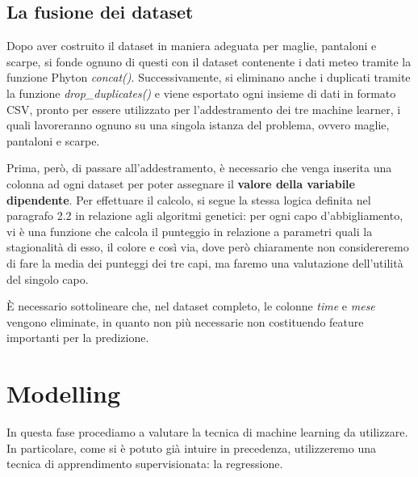 \documentclass[a4paper, 11pt, oneside]{report}
\begin{document}
                \bigskip

                \subsection{La fusione dei dataset}
                Dopo aver costruito il dataset in maniera adeguata per maglie, pantaloni e scarpe, si fonde ognuno di
                questi con il dataset contenente i dati meteo tramite la funzione Phyton \textit{concat()}. Successivamente,
                si eliminano anche i duplicati tramite la funzione \textit{drop\_duplicates()} e viene esportato ogni insieme
                di dati in formato CSV, pronto per essere utilizzato per l'addestramento dei tre machine learner,
                i quali lavoreranno ognuno su una singola istanza del problema, ovvero maglie, pantaloni
                e scarpe.\\
                \par \noindent Prima, però, di passare all'addestramento,
                è necessario che venga inserita una colonna ad ogni dataset per poter assegnare il \textbf{valore della variabile dipendente}.
                Per effettuare il calcolo, si segue la stessa logica definita nel paragrafo 2.2 in relazione agli algoritmi genetici:
                per ogni capo d'abbigliamento, vi è una funzione che calcola il punteggio in relazione a parametri quali la stagionalità
                di esso, il colore e così via, dove però chiaramente non considereremo di fare la media dei punteggi dei
                tre capi, ma faremo una valutazione dell'utilità del singolo capo.\\
                \par \noindent \`E necessario sottolineare che, nel dataset completo, le colonne \textit{time}
                e \textit{mese} vengono eliminate, in quanto non più necessarie non costituendo feature importanti per la predizione.

            \newpage
            \section{Modelling}
            In questa fase procediamo a valutare la tecnica di machine learning da utilizzare. In particolare, come si è
            potuto già intuire in precedenza, utilizzeremo una tecnica di apprendimento supervisionata: la
            regressione.
\end{document}
